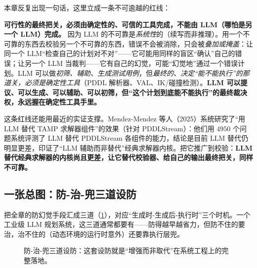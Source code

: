 \noindent 本章反复出现一句话，这里立成一条不可逾越的红线：

\begin{insight}
\textbf{可行性的最终把关，必须由确定性的、可信的工具完成，不能由 LLM（哪怕是另一个 LLM）完成。} 因为 LLM 的不可靠是\emph{系统性}的（续写而非推理）。用一个不可靠的东西去校验另一个不可靠的东西，错误不会被消除，只会被\emph{叠加或掩盖}：让同一个 LLM“检查自己的计划对不对”——它可能用同样的盲区“确认”自己的错误；让另一个 LLM 当裁判——它有自己的幻觉，可能“幻觉地”通过一个错误计划。LLM 可以做\emph{初筛、辅助、生成测试用例}，但\emph{最终的、决定“能不能执行”的那道关，必须是确定性工具}（PDDL 解析器、VAL、IK/碰撞检测）。\textbf{LLM 可以提议、可以生成、可以辅助、可以初筛，但“这个计划到底能不能执行”的最终裁决权，永远握在确定性工具手里。}
\end{insight}

\noindent 这条红线还能用最近的实证支撑。Mendez-Mendez 等人（2025）系统研究了“用 LLM 替代 TAMP 求解器组件”的效果（针对 PDDLStream）：他们用 $4950$ 个问题系统评测了 LLM 替代 PDDLStream 各组件的能力，结论是目前 LLM 替代仍明显更差，印证了“LLM 辅助而非替代”经典求解器内核\cite{mendezmendez2025llmtamp}。把它推广到校验：\textbf{LLM 替代经典求解器的内核尚且更差，让它替代校验器、给自己的输出最终把关，同样不可靠。}

\subsection{一张总图：防-治-兜三道设防}
\label{sec:verify-defense}

把全章的防幻觉手段汇成三道（\cref{fig:defense}），对应“生成时-生成后-执行时”三个时机。一个工业级 LLM 规划系统，这三道通常都要有——防得越早越省力，但防不住的要治，治不住的（动态环境的运行时意外）还要靠执行层兜。

\begin{figure}[H]
\centering
{}
\caption{防-治-兜三道设防：这套设防就是“增强而非取代”在系统工程上的完整落地。}
\label{fig:defense}
\end{figure}

